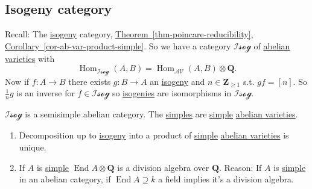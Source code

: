 \documentclass[10pt,]{book}
\numberwithin{equation}{section}
\newcommand{\lb}{[}
\newcommand{\rb}{]}
\newcommand{\ZZ}{\mathbf{Z}}
\newcommand{\QQ}{\mathbf{Q}}
\newcommand{\cat}[1]{\mathcal{#1}}
\DeclareMathOperator{\End}{End}
\DeclareMathOperator{\Hom}{Hom}
\begin{document}
%
%
\typeout{************************************************}
\typeout{************************************************}
%
\subsection[{Isogeny category}]{Isogeny category}\label{subsection-32}
\hypertarget{p-383}{}%
Recall: The \hyperref[def-supersing-isog-isog]{isogeny} category, \hyperref[thm-poincare-reducibility]{Theorem~\ref{thm-poincare-reducibility}}, \hyperref[cor-ab-var-product-simple]{Corollary~\ref{cor-ab-var-product-simple}}. So we have  a category \(\cat{Isog}\) of \hyperref[def-buntes-abvar]{abelian varieties} with%
\begin{equation*}
\Hom_{\cat{Isog}}(A,B) = \Hom_\cat{AV}(A,B)\otimes \QQ\text{.}
\end{equation*}
Now if \(f \colon A \to B\) there exists \(g\colon B \to A\) an \hyperref[def-supersing-isog-isog]{isogeny} and \(n\in \ZZ_{\ge 1}\) s.t. \(gf = \lb n \rb\). So \(\frac 1n g\) is an inverse for \(f \in \cat{Isog}\) so \hyperref[def-supersing-isog-isog]{isogenies} are isomorphisms in \(\cat{Isog}\).%
\par
\hypertarget{p-384}{}%
\(\cat{Isog}\) is a semisimple abelian category. The \hyperref[def-simple-av]{simples} are \hyperref[def-simple-av]{simple} \hyperref[def-buntes-abvar]{abelian varieties}.\leavevmode%
\begin{enumerate}
\item\hypertarget{li-71}{}Decomposition up to \hyperref[def-supersing-isog-isog]{isogeny} into a product of \hyperref[def-simple-av]{simple} \hyperref[def-buntes-abvar]{abelian varieties} is unique.%
\item\hypertarget{li-72}{}If \(A\) is \hyperref[def-simple-av]{simple} \(\End A \otimes \QQ\) is a division algebra over \(\QQ\). Reason: If \(A\) is \hyperref[def-simple-av]{simple} in an abelian category, if \(\End A \supseteq k\) a field implies it's a division algebra.%
\end{enumerate}
%
%
%
\typeout{************************************************}
\typeout{************************************************}
%
\end{document}
